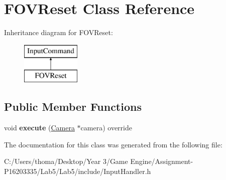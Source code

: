 \hypertarget{class_f_o_v_reset}{}\section{F\+O\+V\+Reset Class Reference}
\label{class_f_o_v_reset}
Inheritance diagram for F\+O\+V\+Reset\+:\begin{figure}[H]
\begin{center}
\leavevmode
\includegraphics[height=2.000000cm]{class_f_o_v_reset}
\end{center}
\end{figure}
\subsection*{Public Member Functions}
\begin{DoxyCompactItemize}
\item 
\mbox{\label{class_f_o_v_reset_a12f759d29589637255e9696b99fe65ba}} 
void {\bfseries execute} (\mbox{\hyperlink{class_camera}{Camera}} $\ast$camera) override
\end{DoxyCompactItemize}


The documentation for this class was generated from the following file\+:\begin{DoxyCompactItemize}
\item 
C\+:/\+Users/thoma/\+Desktop/\+Year 3/\+Game Engine/\+Assignment-\/\+P16203335/\+Lab5/\+Lab5/include/Input\+Handler.\+h\end{DoxyCompactItemize}
